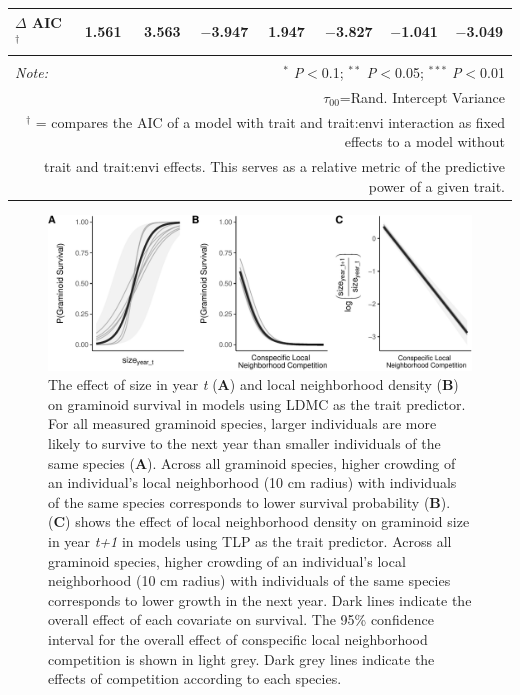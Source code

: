 \documentclass[12pt, letterpaper]{article}
\begin{document}
\begin{table}[h]
{\begin{tabular}{lccccccc}
\hline 
\rowcolor[gray]{.95}$\Delta$ AIC$^\dagger$  & 1.561 & 3.563 & $-$3.947 & 1.947 & $-$3.827 & $-$1.041 & $-$3.049 \\
\hline 
\hline \\[-1.8ex] 
\textit{Note:}  & \multicolumn{7}{r}{$^{*}$ \textit{P}$<$0.1; $^{**}$ \textit{P}$<$0.05; $^{***}$ \textit{P}$<$0.01} \\ 
\multicolumn{8}{r}{$\tau_{00}$=Rand. Intercept Variance}\\ 
\multicolumn{8}{r}{$^\dagger$ = compares the AIC of a model with trait and trait:envi interaction as fixed effects to a model without}\\
\multicolumn{8}{r}{trait and trait:envi effects. This serves as a relative metric of the predictive power of a given trait.}
\end{tabular} }
\end{table} 

\begin{figure}
    \centering
    \includegraphics[width=.8\textwidth]{survEffectPlots-1.pdf}
    \caption{The effect of size in year \textit{t} (\textbf{A}) and local neighborhood density (\textbf{B}) on graminoid survival in models using LDMC as the trait predictor. For all measured graminoid species, larger individuals are more likely to survive to the next year than smaller individuals of the same species (\textbf{A}). Across all graminoid species, higher crowding of an individual's local neighborhood (10 cm radius) with individuals of the same species corresponds to lower survival probability (\textbf{B}). (\textbf{C}) shows the effect of local neighborhood density on graminoid size in year \textit{t+1} in models using TLP as the trait predictor. Across all graminoid species, higher crowding of an individual's local neighborhood (10 cm radius) with individuals of the same species corresponds to lower growth in the next year. Dark lines indicate the overall effect of each covariate on survival. The 95\% confidence interval for the overall effect of conspecific local neighborhood competition is shown in light grey. Dark grey lines indicate the effects of competition according to each species.}
    \label{fig:Effects_Survival}
\end{figure}
\end{document}
